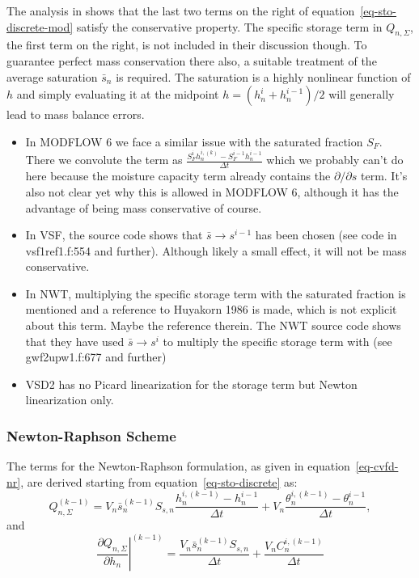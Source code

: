 \documentclass[fleqn]{article}
\begin{document}
The analysis in \cite{celia-1990} shows that the last two terms on
the right of equation~\ref{eq-sto-discrete-mod} satisfy the conservative
property. The specific storage term in $Q_{n,\Sigma}$, the first term
on the right, is not included in their discussion though. To guarantee
perfect mass conservation there also, a suitable treatment of the average
saturation $\bar{s}_n$ is required. The saturation is a highly nonlinear
function of $h$ and simply evaluating it at the midpoint
$h = (h_n^i+h_n^{i-1})/2$ will generally lead to mass balance errors.
\begin{itemize}
  \item In MODFLOW 6 we face a similar issue with the saturated fraction $S_F$.
        There we convolute the term as 
        $\frac{S_F^i h_n^{i,(k)} - S_F^{i-1} h_n^{i-1}}{\Delta t}$ which
        we probably can't do here because the moisture capacity term
        already contains the $\partial/\partial s$ term. It's also not
        clear yet why this is allowed in MODFLOW 6, although it has
        the advantage of being mass conservative of course.
  \item In VSF, the source code shows that $\bar{s} \rightarrow s^{i-1}$
        has been chosen (see code in vsf1ref1.f:554 and further). Although 
        likely a small effect, it will not be mass conservative.
  \item In NWT, multiplying the specific storage term with the saturated fraction
        is mentioned and a reference to Huyakorn 1986 is made, which is not explicit 
        about this term. Maybe the reference therein. The NWT source code shows
        that they have used $\bar{s} \rightarrow s^{i}$ to multiply
        the specific storage term with (see gwf2upw1.f:677 and further)
  \item VSD2 has no Picard linearization for the storage term but Newton
        linearization only.
\end{itemize}

\subsubsection*{Newton-Raphson Scheme}
The terms for the Newton-Raphson formulation, as given in
equation~\ref{eq-cvfd-nr}, are derived starting from
equation~\ref{eq-sto-discrete} as:
\begin{equation}
  Q_{n,\Sigma}^{(k-1)} = 
  V_n \bar{s}_n^{(k-1)} S_{s,n}
  \frac{h_n^{i,(k-1)} - h_n^{i-1}}{\Delta t} +
  V_n \frac{\theta_n^{i,(k-1)} - \theta_n^{i-1}}{\Delta t},
\end{equation}
and
\begin{equation}
  \left.\frac{\partial Q_{n,\Sigma}}{\partial h_n}\right|^{(k-1)} =
  \frac{V_n \bar{s}_n^{(k-1)} S_{s,n}}{\Delta t} +
  \frac{V_n C_n^{i,(k-1)}}{\Delta t}
\end{equation}
\end{document}
